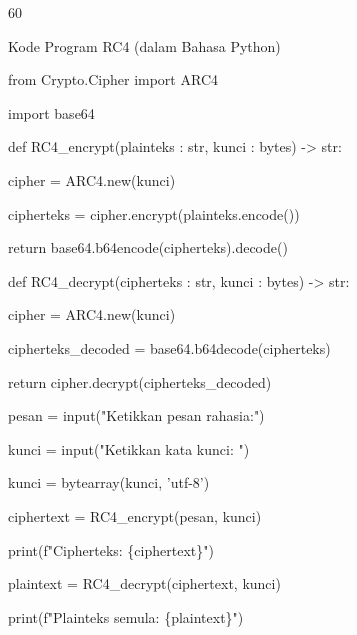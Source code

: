 \documentclass{article}
\begin{document}

60

Kode Program RC4 (dalam Bahasa Python) 

from Crypto.Cipher import ARC4

import base64

def RC4\_encrypt(plainteks : str, kunci : bytes) -> str:

    cipher = ARC4.new(kunci) 

    cipherteks = cipher.encrypt(plainteks.encode())

    return base64.b64encode(cipherteks).decode()

def RC4\_decrypt(cipherteks : str, kunci : bytes) -> str:

    cipher = ARC4.new(kunci) 

    cipherteks\_decoded = base64.b64decode(cipherteks)

    return cipher.decrypt(cipherteks\_decoded)

pesan = input("Ketikkan pesan rahasia:")

kunci = input("Ketikkan kata kunci: ")

kunci = bytearray(kunci, 'utf-8')

ciphertext = RC4\_encrypt(pesan, kunci)

print(f"Cipherteks: \{ciphertext\}")

plaintext = RC4\_decrypt(ciphertext, kunci)

print(f"Plainteks semula: \{plaintext\}")
\end{document}
